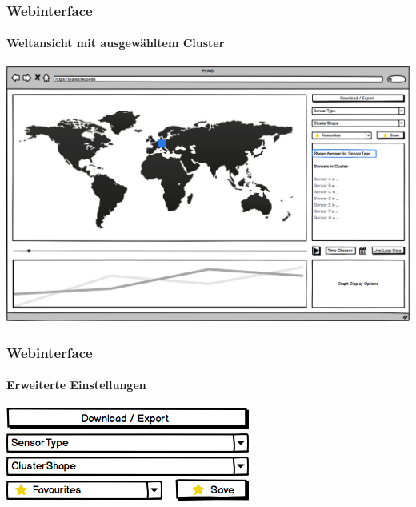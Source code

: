 \documentclass{beamer}
\begin{document}
\begin{frame}
	\frametitle{Webinterface}
	\framesubtitle{Weltansicht mit ausgewähltem Cluster}
	\centering
	\includegraphics[width=\linewidth]{gui/frontend/FrontGUIWorldWithShapeSelection}
\end{frame}

\begin{frame}
	\frametitle{Webinterface}
	\framesubtitle{Erweiterte Einstellungen}
	\centering
	\includegraphics[width=0.5\linewidth]{gui/frontend/FrontGUIDownloadButton}\\[2mm]
	\includegraphics[width=0.5\linewidth]{gui/frontend/FrontGUISensorType}\\[2mm]
	\includegraphics[width=0.5\linewidth]{gui/frontend/FrontGUIShapeType}\\[2mm]
	\includegraphics[width=0.5\linewidth]{gui/frontend/FrontGUIFavourites}
\end{frame}
\end{document}
